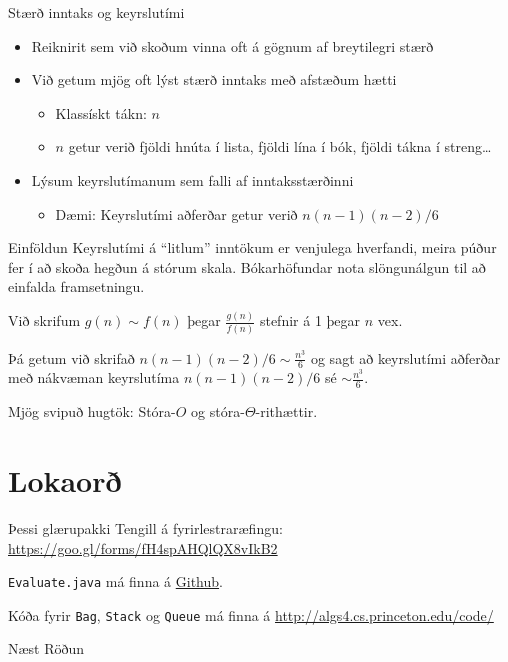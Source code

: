\documentclass[handout]{beamer}
\begin{document}
\begin{frame}{Stærð inntaks og keyrslutími}
\begin{itemize}
 \item Reiknirit sem við skoðum vinna oft á gögnum af breytilegri stærð
 \item Við getum mjög oft lýst stærð inntaks með afstæðum hætti
 \begin{itemize}
  \item Klassískt tákn: $n$
  \item $n$ getur verið fjöldi hnúta í lista, fjöldi lína í bók, fjöldi tákna í streng\ldots
 \end{itemize}
 \item Lýsum keyrslutímanum sem falli af inntaksstærðinni
 \begin{itemize}
  \item Dæmi: Keyrslutími aðferðar getur verið $n(n-1)(n-2)/6$
 \end{itemize}
\end{itemize}
\end{frame}

\begin{frame}{Einföldun}
Keyrslutími á ``litlum'' inntökum er venjulega hverfandi, meira púður fer í að skoða hegðun á stórum skala. Bókarhöfundar nota slöngunálgun  til að einfalda framsetningu.
\begin{tcolorbox}
Við skrifum $g(n) \sim f(n)$ þegar $\frac{g(n)}{f(n)}$ stefnir á 1 þegar $n$ vex.
\end{tcolorbox}
Þá getum við skrifað $n(n-1)(n-2)/6 \sim \frac{n^3}{6}$ og sagt að keyrslutími aðferðar með nákvæman keyrslutíma $n(n-1)(n-2)/6$ sé $\sim \frac{n^3}{6}$.

\vspace{1cm}
Mjög svipuð hugtök: Stóra-$O$ og stóra-$\Theta$-rithættir.
\end{frame}

\section{Lokaorð}

\begin{frame}{Þessi glærupakki}
Tengill á fyrirlestraræfingu: \url{https://goo.gl/forms/fH4spAHQlQX8vIkB2}
\vspace{1cm}

\texttt{Evaluate.java} má finna á \href{https://github.com/Ernir/kennsluefni/tree/master/T2/Code/w5}{Github}. 

Kóða fyrir \texttt{Bag}, \texttt{Stack} og \texttt{Queue} má finna á \url{http://algs4.cs.princeton.edu/code/}
\end{frame}

\begin{frame}{Næst}
Röðun
\end{frame}
\end{document}

